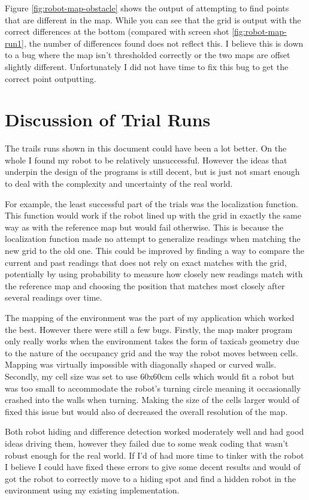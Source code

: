 \documentclass{article}
\begin{document}
Figure \ref{fig:robot-map-obstacle} shows the output of attempting to find points that are different in the map. While you can see that the grid is output with the correct differences at the bottom (compared with screen shot \ref{fig:robot-map-run1}, the number of differences found does not reflect this. I believe this is down to a bug where the map isn't thresholded correctly or the two maps are offset slightly different. Unfortunately I did not have time to fix this bug to get the correct point outputting.

\section{Discussion of Trial Runs}
The trails runs shown in this document could have been a lot better. On the whole I found my robot to be relatively unsuccessful. However the ideas that underpin the design of the programs is still decent, but is just not smart enough to deal with the complexity and uncertainty of the real world.

For example, the least successful part of the trials was the localization function. This function would work if the robot lined up with the grid in exactly the same way as with the reference map but would fail otherwise. This is because the localization function made no attempt to generalize readings when matching the new grid to the old one. This could be improved by finding a way to compare the current and past readings that does not rely on exact matches with the grid, potentially by using probability to measure how closely new readings match with the reference map and choosing the position that matches most closely after several readings over time.

The mapping of the environment was the part of my application which worked the best. However there were still a few bugs. Firstly, the map maker program only really works when the environment takes the form of taxicab geometry due to the nature of the occupancy grid and the way the robot moves between cells. Mapping was virtually impossible with diagonally shaped or curved walls. Secondly, my cell size was set to use 60x60cm cells which would fit a robot but was too small to accommodate the robot's turning circle meaning it occasionally crashed into the walls when turning. Making the size of the cells larger would of fixed this issue but would also of decreased the overall resolution of the map.

Both robot hiding and difference detection worked moderately well and had good ideas driving them, however they failed due to some weak coding that wasn't robust enough for the real world. If I'd of had more time to tinker with the robot I believe I could have fixed these errors to give some decent results and would of got the robot to correctly move to a hiding spot and find a hidden robot in the environment using my existing implementation.
\end{document}
